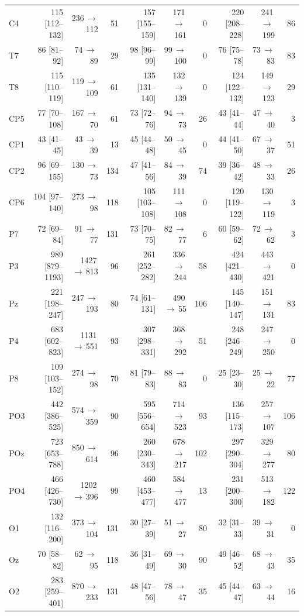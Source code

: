 \begin{tabular}{lrrrrrrrrr}
C4 & 115 [112--132] & 236\,$\to$\,112 & 51 & 157 [155--159] & 171\,$\to$\,161 & 0 & 220 [208--228] & 241\,$\to$\,199 & 86 \\
T7 & 86 [81--92] & 74\,$\to$\,89 & 29 & 98 [96--99] & 99\,$\to$\,100 & 0 & 76 [75--78] & 73\,$\to$\,83 & 83 \\
T8 & 115 [110--119] & 119\,$\to$\,109 & 61 & 135 [131--140] & 132\,$\to$\,139 & 0 & 124 [122--132] & 149\,$\to$\,123 & 29 \\
CP5 & 77 [70--108] & 167\,$\to$\,70 & 61 & 73 [72--76] & 94\,$\to$\,73 & 26 & 43 [41--44] & 47\,$\to$\,40 & 3 \\
CP1 & 43 [41--45] & 43\,$\to$\,39 & 13 & 45 [44--48] & 50\,$\to$\,45 & 0 & 44 [41--50] & 67\,$\to$\,37 & 51 \\
CP2 & 96 [69--155] & 130\,$\to$\,73 & 134 & 47 [41--56] & 84\,$\to$\,39 & 74 & 39 [36--42] & 48\,$\to$\,33 & 26 \\
CP6 & 104 [97--140] & 273\,$\to$\,98 & 118 & 105 [103--108] & 111\,$\to$\,108 & 0 & 120 [119--122] & 130\,$\to$\,119 & 3 \\
P7 & 72 [69--84] & 91\,$\to$\,77 & 131 & 73 [70--75] & 82\,$\to$\,77 & 6 & 60 [59--62] & 72\,$\to$\,62 & 3 \\
P3 & 989 [879--1193] & 1427\,$\to$\,813 & 96 & 261 [252--282] & 336\,$\to$\,244 & 58 & 424 [421--430] & 443\,$\to$\,421 & 0 \\
Pz & 221 [198--247] & 247\,$\to$\,193 & 80 & 74 [61--131] & 490\,$\to$\,55 & 106 & 145 [140--147] & 151\,$\to$\,131 & 83 \\
P4 & 683 [602--823] & 1131\,$\to$\,551 & 93 & 307 [298--331] & 368\,$\to$\,292 & 51 & 248 [246--249] & 247\,$\to$\,250 & 0 \\
P8 & 109 [103--152] & 274\,$\to$\,98 & 70 & 81 [79--83] & 88\,$\to$\,83 & 0 & 25 [23--30] & 25\,$\to$\,22 & 77 \\
PO3 & 442 [386--525] & 574\,$\to$\,359 & 90 & 595 [556--654] & 714\,$\to$\,523 & 93 & 136 [115--173] & 257\,$\to$\,107 & 106 \\
POz & 723 [653--788] & 850\,$\to$\,614 & 96 & 260 [230--343] & 678\,$\to$\,217 & 102 & 297 [290--304] & 329\,$\to$\,277 & 80 \\
PO4 & 466 [426--730] & 1202\,$\to$\,396 & 99 & 460 [453--477] & 584\,$\to$\,477 & 13 & 231 [200--300] & 513\,$\to$\,182 & 122 \\
O1 & 132 [116--200] & 373\,$\to$\,104 & 131 & 30 [27--39] & 51\,$\to$\,27 & 80 & 32 [31--33] & 39\,$\to$\,31 & 0 \\
Oz & 70 [58--82] & 62\,$\to$\,95 & 118 & 36 [31--49] & 69\,$\to$\,30 & 90 & 49 [46--52] & 68\,$\to$\,43 & 35 \\
O2 & 283 [259--401] & 870\,$\to$\,233 & 131 & 48 [47--56] & 78\,$\to$\,47 & 35 & 45 [44--47] & 63\,$\to$\,44 & 16 \\
\bottomrule
\end{tabular}

